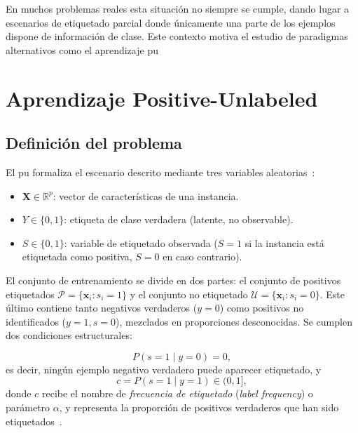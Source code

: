 En muchos problemas reales esta situación no siempre se cumple, dando lugar a escenarios de etiquetado parcial donde únicamente una parte de los ejemplos dispone de información de clase. Este contexto motiva el estudio de paradigmas alternativos como el aprendizaje \acrshort{pu}

\section{Aprendizaje Positive-Unlabeled}
\label{sec:pu_learning}

\subsection{Definición del problema}
\label{subsec:definicion_pu}

El \acrfull{pu} formaliza el escenario descrito mediante tres variables
aleatorias~\cite{elkan2008learning, bekker2020learning}:

\begin{itemize}
  \item $\mathbf{X} \in \mathbb{R}^p$: vector de características de una instancia.
  \item $Y \in \{0, 1\}$: etiqueta de clase verdadera (latente, no observable).
  \item $S \in \{0, 1\}$: variable de etiquetado observada ($S=1$ si la instancia
  está etiquetada como positiva, $S=0$ en caso contrario).
\end{itemize}

El conjunto de entrenamiento se divide en dos partes: el conjunto de positivos
etiquetados $\mathcal{P} = \{\mathbf{x}_i : s_i = 1\}$ y el conjunto no etiquetado
$\mathcal{U} = \{\mathbf{x}_i : s_i = 0\}$. Este último contiene tanto negativos
verdaderos ($y=0$) como positivos no identificados ($y=1, s=0$), mezclados en
proporciones desconocidas. Se cumplen dos condiciones estructurales:

\begin{equation}
  P(s=1 \mid y=0) = 0,
  \label{eq:no_false_pos}
\end{equation}
es decir, ningún ejemplo negativo verdadero puede aparecer etiquetado, y
\begin{equation}
  c = P(s=1 \mid y=1) \in (0, 1],
  \label{eq:label_freq}
\end{equation}
donde $c$ recibe el nombre de \textit{frecuencia de etiquetado} (\textit{label
frequency}) o parámetro $\alpha$, y representa la proporción de positivos verdaderos
que han sido etiquetados~\cite{elkan2008learning}.


